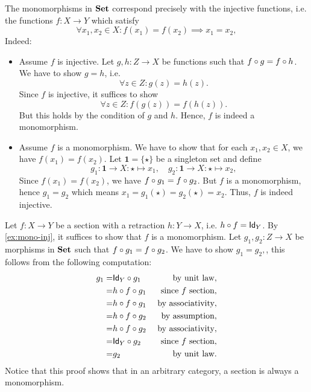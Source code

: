 \begin{solution}\label{sol:mono-inj}
The monomorphisms in $\SET$ correspond precisely with the injective functions, i.e. the functions $f:X\to Y$ which satisfy
\[
\forall x_1,x_2\in X: f(x_1)=f(x_2) \implies x_1=x_2,
\]
Indeed:
\begin{itemize}
\item Assume $f$ is injective. Let $g,h: Z\to X$ be functions such that $\co{g}{f}=\co{h}{f}$. We have to show $g=h$, i.e. 
\[
\forall z\in Z: g(z)=h(z).
\]
Since $f$ is injective, it suffices to show 
\[
\forall z\in Z: f(g(z))=f(h(z)).
\]
But this holds by the condition of $g$ and $h$. Hence, $f$ is indeed a monomorphism.
\item Assume $f$ is a monomorphism. We have to show that for each $x_1,x_2\in X$, we have $f(x_1) = f(x_2)$. Let $\mathbf{1} = \{\star\}$ be a singleton set and define
\[
g_1 : \mathbf{1}\to X: \star\mapsto x_1,\quad  g_2 : \mathbf{1}\to X: \star\mapsto x_2, 
\]
Since $f(x_1)=f(x_2)$, we have $\co{g_1}{f} = \co{g_2}{f}$. But $f$ is a monomorphism, hence $g_1 = g_2$ which means $x_1 = g_1(\star) = g_2(\star) = x_2$. Thus, $f$ is indeed injective.
\end{itemize}
\end{solution}

\begin{solution}\label{sol:sections_in_set_injective}
Let $f:X\to Y$ be a section with a retraction $h:Y\to X$, i.e. $\co{f}{h} = \Id[Y]$. By \cref{ex:mono-inj}, it suffices to show that $f$ is a monomorphism. Let  $g_1, g_2 : Z \to X$ be morphisms in $\SET$ such that $\co{g_1}{f} = \co{g_2}{f}$. We have to show $g_1=g_2,$, this follows from the following computation:
\begin{eqnarray*}
g_1 =& \co{g_1}{\Id[Y]} & \text{ by unit law},\\ 
	=& \co{g_1}{\co{f}{h}} & \text{ since $f$ section},\\ 
	=& \co{\co{g_1}{f}}{h} & \text{ by associativity},\\
	=&  \co{\co{g_2}{f}}{h} & \text{ by assumption},\\
	=& \co{g_2}{\co{f}{h}} & \text{ by associativity},\\ 
	=& \co{g_2}{\Id[Y]} & \text{ since $f$ section},\\
	=& g_2 & \text{ by unit law}.
\end{eqnarray*}
Notice that this proof shows that in an arbitrary category, a section is always a monomorphism.
\end{solution}

